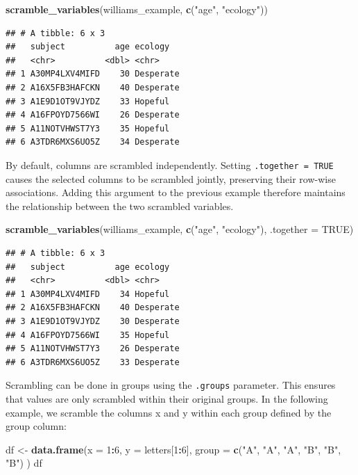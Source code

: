 \documentclass[
  english,
  man,floatsintext]{apa6}
\newenvironment{Shaded}{\begin{snugshade}}{\end{snugshade}}
\newcommand{\AttributeTok}[1]{\textcolor[rgb]{0.13,0.29,0.53}{#1}}
\newcommand{\ConstantTok}[1]{\textcolor[rgb]{0.56,0.35,0.01}{#1}}
\newcommand{\DecValTok}[1]{\textcolor[rgb]{0.00,0.00,0.81}{#1}}
\newcommand{\FunctionTok}[1]{\textcolor[rgb]{0.13,0.29,0.53}{\textbf{#1}}}
\newcommand{\NormalTok}[1]{#1}
\newcommand{\OtherTok}[1]{\textcolor[rgb]{0.56,0.35,0.01}{#1}}
\newcommand{\SpecialCharTok}[1]{\textcolor[rgb]{0.81,0.36,0.00}{\textbf{#1}}}
\newcommand{\StringTok}[1]{\textcolor[rgb]{0.31,0.60,0.02}{#1}}
\begin{document}
\begin{Shaded}
\begin{Highlighting}[]
\FunctionTok{scramble\_variables}\NormalTok{(williams\_example, }\FunctionTok{c}\NormalTok{(}\StringTok{"age"}\NormalTok{, }\StringTok{"ecology"}\NormalTok{))}
\end{Highlighting}
\end{Shaded}

\begin{verbatim}
## # A tibble: 6 x 3
##   subject          age ecology  
##   <chr>          <dbl> <chr>    
## 1 A30MP4LXV4MIFD    30 Desperate
## 2 A16X5FB3HAFCKN    40 Desperate
## 3 A1E9D1OT9VJYDZ    33 Hopeful  
## 4 A16FPOYD7566WI    26 Desperate
## 5 A11NOTVHWST7Y3    35 Hopeful  
## 6 A3TDR6MXS6UO5Z    34 Desperate
\end{verbatim}

By default, columns are scrambled independently. Setting \texttt{.together\ =\ TRUE} causes the selected columns to be scrambled jointly, preserving their row-wise associations. Adding this argument to the previous example therefore maintains the relationship between the two scrambled variables.

\begin{Shaded}
\begin{Highlighting}[]
\FunctionTok{scramble\_variables}\NormalTok{(williams\_example, }\FunctionTok{c}\NormalTok{(}\StringTok{"age"}\NormalTok{, }\StringTok{"ecology"}\NormalTok{), }\AttributeTok{.together =} \ConstantTok{TRUE}\NormalTok{)}
\end{Highlighting}
\end{Shaded}

\begin{verbatim}
## # A tibble: 6 x 3
##   subject          age ecology  
##   <chr>          <dbl> <chr>    
## 1 A30MP4LXV4MIFD    34 Hopeful  
## 2 A16X5FB3HAFCKN    40 Desperate
## 3 A1E9D1OT9VJYDZ    30 Desperate
## 4 A16FPOYD7566WI    35 Hopeful  
## 5 A11NOTVHWST7Y3    26 Desperate
## 6 A3TDR6MXS6UO5Z    33 Desperate
\end{verbatim}

Scrambling can be done in groups using the \texttt{.groups} parameter. This ensures that values are only scrambled within their original groups. In the following example, we scramble the columns x and y within each group defined by the group column:

\begin{Shaded}
\begin{Highlighting}[]
\NormalTok{df }\OtherTok{\textless{}{-}} \FunctionTok{data.frame}\NormalTok{(}\AttributeTok{x =} \DecValTok{1}\SpecialCharTok{:}\DecValTok{6}\NormalTok{,}
                 \AttributeTok{y =}\NormalTok{ letters[}\DecValTok{1}\SpecialCharTok{:}\DecValTok{6}\NormalTok{],}
                 \AttributeTok{group =} \FunctionTok{c}\NormalTok{(}\StringTok{"A"}\NormalTok{, }\StringTok{"A"}\NormalTok{, }\StringTok{"A"}\NormalTok{, }\StringTok{"B"}\NormalTok{, }\StringTok{"B"}\NormalTok{, }\StringTok{"B"}\NormalTok{)}
\NormalTok{                 )}
\NormalTok{df }
\end{Highlighting}
\end{Shaded}
\end{document}
